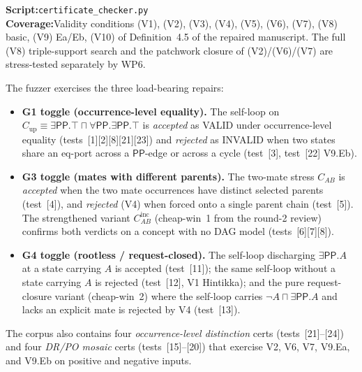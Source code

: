 \documentclass[11pt]{article}
\newcommand{\PP}{\mathsf{PP}}
\begin{document}
\textbf{Script:}\quad \texttt{certificate\_checker.py}\\
\textbf{Coverage:}\quad Validity conditions (V1), (V2), (V3),
(V4), (V5), (V6), (V7), (V8) basic, (V9) Ea/Eb, (V10) of
Definition~4.5 of the repaired manuscript.  The full (V8)
triple-support search and the patchwork closure of (V2)/(V6)/(V7)
are stress-tested separately by WP6.

The fuzzer exercises the three load-bearing repairs:
\begin{itemize}[leftmargin=2em]
  \item \textbf{G1 toggle (occurrence-level equality).}
    The self-loop on
    \(C_{\mathrm{up}} \equiv \exists\PP.\top \sqcap \forall\PP.\exists\PP.\top\)
    is \emph{accepted} as VALID under occurrence-level equality
    (tests~[1][2][8][21][23]) and \emph{rejected} as INVALID when
    two states share an eq-port across a \(\PP\)-edge or across a
    cycle (test~[3], test~[22] V9.Eb).
  \item \textbf{G3 toggle (mates with different parents).}
    The two-mate stress \(C_{AB}\) is \emph{accepted} when the two
    mate occurrences have distinct selected parents (test~[4]),
    and \emph{rejected} (V4) when forced onto a single parent
    chain (test~[5]).  The strengthened variant \(C_{AB}^{\mathrm{inc}}\)
    (cheap-win~1 from the round-2 review) confirms both verdicts
    on a concept with no DAG model (tests~[6][7][8]).
  \item \textbf{G4 toggle (rootless / request-closed).}
    The self-loop discharging \(\exists\PP.A\) at a state carrying
    \(A\) is accepted (test~[11]); the same self-loop without a
    state carrying \(A\) is rejected (test~[12], V1 Hintikka);
    and the pure request-closure variant (cheap-win~2) where
    the self-loop carries \(\neg A \sqcap \exists\PP.A\) and lacks
    an explicit mate is rejected by V4 (test~[13]).
\end{itemize}

The corpus also contains four \emph{occurrence-level distinction}
certs (tests~[21]--[24]) and four \emph{DR/PO mosaic} certs
(tests~[15]--[20]) that exercise V2, V6, V7, V9.Ea, and V9.Eb on
positive and negative inputs.
\end{document}
